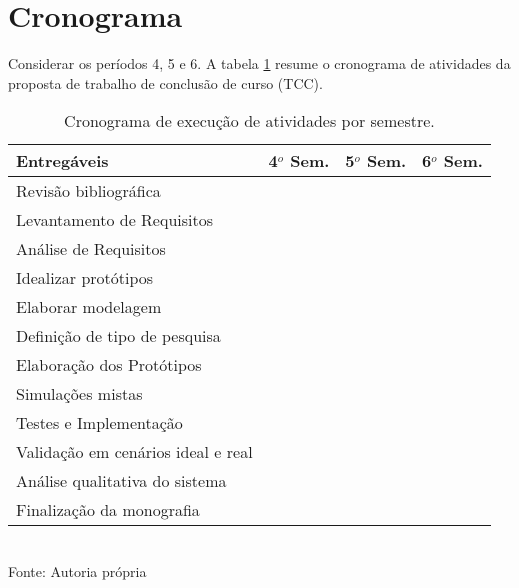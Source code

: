 \section{Cronograma}
Considerar os períodos 4, 5 e 6.
A tabela \ref{tab:cronograma} resume o cronograma de atividades da proposta de trabalho de conclusão de curso (TCC).

\begin{table}[H]
	\begin{center}
	\caption{Cronograma de execução de atividades por semestre.}
		\label{tab:cronograma}
		\begin{tabular}{|l|c|c|c|}
			\hline
			\textbf{Entregáveis} & \textbf{4$^o$ Sem.} & \textbf{5$^o$ Sem.}& \textbf{6$^o$ Sem.}\\\hline
			Revisão bibliográfica & \cellcolor{gray!50}    &   &    \\\hline
			Levantamento de Requisitos  &  \cellcolor{gray!50}  &   &  \\\hline
			Análise de Requisitos &  \cellcolor{gray!50}  &   &  \\\hline
			Idealizar protótipos &  \cellcolor{gray!50} &  \cellcolor{gray!50} &  \\\hline
			Elaborar modelagem & &  \cellcolor{gray!50} &  \\\hline
			Definição de tipo de pesquisa &    & \cellcolor{gray!50}  &  \\\hline
			Elaboração dos Protótipos &    &  \cellcolor{gray!50} & \cellcolor{gray!50}\\\hline
			Simulações mistas &    &   & \cellcolor{gray!50} \\\hline
			Testes e Implementação &    &   & \cellcolor{gray!50} \\\hline
			Validação em cenários ideal e real &    &   & \cellcolor{gray!50}\\\hline
			Análise qualitativa do sistema &    &   &  \cellcolor{gray!50}\\\hline
			Finalização da monografia  &    &   & \cellcolor{gray!50} \\\hline
			
		\end{tabular}
		\vspace{0.5cm}	\\Fonte: Autoria própria
	\end{center}
\end{table}